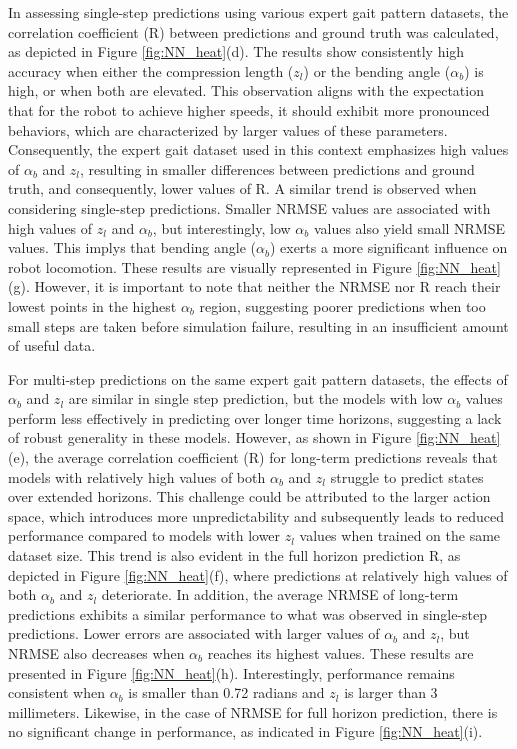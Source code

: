 In assessing single-step predictions using various expert gait pattern datasets, the correlation coefficient (R) between predictions and ground truth was calculated, as depicted in Figure \ref{fig:NN_heat}(d). The results show consistently high accuracy when either the compression length ($z_l$) or the bending angle ($\alpha_b$) is high, or when both are elevated. This observation aligns with the expectation that for the robot to achieve higher speeds, it should exhibit more pronounced behaviors, which are characterized by larger values of these parameters. Consequently, the expert gait dataset used in this context emphasizes high values of $\alpha_b$ and $z_l$, resulting in smaller differences between predictions and ground truth, and consequently, lower values of R. A similar trend is observed when considering single-step predictions. Smaller NRMSE values are associated with high values of $z_l$ and $\alpha_b$, but interestingly, low $\alpha_b$ values also yield small NRMSE values. This implys that bending angle ($\alpha_b$) exerts a more significant influence on robot locomotion. These results are visually represented in Figure \ref{fig:NN_heat}(g). However, it is important to note that neither the NRMSE nor R reach their lowest points in the highest $\alpha_b$ region, suggesting poorer predictions when too small steps are taken before simulation failure, resulting in an insufficient amount of useful data.

For multi-step predictions on the same expert gait pattern datasets, the effects of $\alpha_b$ and $z_l$ are similar in single step prediction, but the models with low $\alpha_b$ values perform less effectively in predicting over longer time horizons, suggesting a lack of robust generality in these models. However, as shown in Figure \ref{fig:NN_heat}(e), the average correlation coefficient (R) for long-term predictions reveals that models with relatively high values of both $\alpha_b$ and $z_l$ struggle to predict states over extended horizons. This challenge could be attributed to the larger action space, which introduces more unpredictability and subsequently leads to reduced performance compared to models with lower $z_l$ values when trained on the same dataset size. This trend is also evident in the full horizon prediction R, as depicted in Figure \ref{fig:NN_heat}(f), where predictions at relatively high values of both $\alpha_b$ and $z_l$ deteriorate. In addition, the average NRMSE of long-term predictions exhibits a similar performance to what was observed in single-step predictions. Lower errors are associated with larger values of $\alpha_b$ and $z_l$, but NRMSE also decreases when $\alpha_b$ reaches its highest values. These results are presented in Figure \ref{fig:NN_heat}(h). Interestingly, performance remains consistent when $\alpha_b$ is smaller than 0.72 radians and $z_l$ is larger than 3 millimeters. Likewise, in the case of NRMSE for full horizon prediction, there is no significant change in performance, as indicated in Figure \ref{fig:NN_heat}(i).

